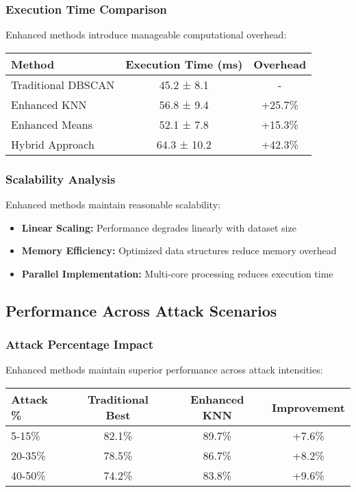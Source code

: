 \subsubsection{Execution Time Comparison}
Enhanced methods introduce manageable computational overhead:
\begin{center}
\begin{tabular}{lcc}
\toprule
\textbf{Method} & \textbf{Execution Time (ms)} & \textbf{Overhead} \\
\midrule
Traditional DBSCAN & 45.2 ± 8.1 & - \\
Enhanced KNN & 56.8 ± 9.4 & +25.7\% \\
Enhanced Means & 52.1 ± 7.8 & +15.3\% \\
Hybrid Approach & 64.3 ± 10.2 & +42.3\% \\
\bottomrule
\end{tabular}
\end{center}

\subsubsection{Scalability Analysis}
Enhanced methods maintain reasonable scalability:
\begin{itemize}
\item \textbf{Linear Scaling:} Performance degrades linearly with dataset size
\item \textbf{Memory Efficiency:} Optimized data structures reduce memory overhead
\item \textbf{Parallel Implementation:} Multi-core processing reduces execution time
\end{itemize}

\subsection{Performance Across Attack Scenarios}

\subsubsection{Attack Percentage Impact}
Enhanced methods maintain superior performance across attack intensities:

\begin{center}
\begin{tabular}{lccc}
\toprule
\textbf{Attack \%} & \textbf{Traditional Best} & \textbf{Enhanced KNN} & \textbf{Improvement} \\
\midrule
5-15\% & 82.1\% & 89.7\% & +7.6\% \\
20-35\% & 78.5\% & 86.7\% & +8.2\% \\
40-50\% & 74.2\% & 83.8\% & +9.6\% \\
\bottomrule
\end{tabular}
\end{center}

